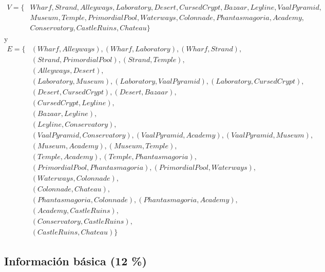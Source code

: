 \documentclass{article}
\begin{document}
\begin{equation*}
    \begin{split}
V = \{& Wharf, Strand, Alleyways, Laboratory, Desert, CursedCrypt, Bazaar, Leyline, VaalPyramid, \\
      & Museum, Temple, PrimordialPool, Waterways, Colonnade, Phantasmagoria, Academy, \\
      & Conservatory, CastleRuins, Chateau\}
    \end{split}
\end{equation*}
 y
 \begin{equation*}
     \begin{split}
E =  \big \{ & (Wharf, Alleyways), (Wharf, Laboratory), (Wharf, Strand), \\
        & (Strand, PrimordialPool), (Strand, Temple), \\
        & (Alleyways, Desert), \\
        & (Laboratory, Museum), (Laboratory, VaalPyramid), (Laboratory, CursedCrypt), \\
        & (Desert, CursedCrypt), (Desert, Bazaar), \\
        & (CursedCrypt, Leyline), \\
        & (Bazaar, Leyline), \\
        & (Leyline, Conservatory), \\
        & (VaalPyramid, Conservatory), (VaalPyramid, Academy), (VaalPyramid, Museum), \\
        & (Museum, Academy), (Museum, Temple), \\
        & (Temple, Academy), (Temple, Phantasmagoria), \\
        & (PrimordialPool, Phantasmagoria), (PrimordialPool, Waterways), \\
        & (Waterways, Colonnade), \\
        & (Colonnade, Chateau), \\
        & (Phantasmagoria, Colonnade), (Phantasmagoria, Academy), \\
        & (Academy, CastleRuins), \\
        & (Conservatory, CastleRuins), \\
        & (CastleRuins, Chateau) \big \}   
     \end{split}
 \end{equation*}

\pagebreak

\subsection{Información básica (12 \%)}
\end{document}
